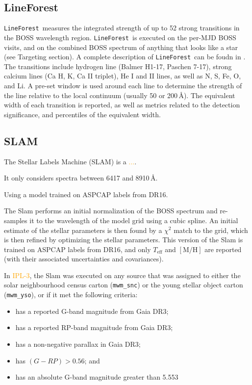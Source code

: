 \documentclass[modern]{aastex631}
\newcommand{\pipeline}[1]{\texttt{#1}}
\newcommand{\LineForest}{\pipeline{LineForest}}
\newcommand{\todo}[1]{\textcolor{orange}{#1}}
\newcommand{\teff}{T_\mathrm{eff}}
\newcommand{\mh}{[\mathrm{M/H}]}
\begin{document}
\subsection{LineForest} \label{sec:methods-line-forest}

\LineForest\ measures the integrated strength of up to 52 strong transitions in the BOSS wavelength region. \LineForest\ is executed on the per-MJD BOSS visits, and on the combined BOSS spectrum of anything that looks like a star (see Targeting section). A complete description of \LineForest\ can be foudn in \citet{somewhere}. The transitions include hydrogen line (Balmer H1-17, Paschen 7-17), strong calcium lines (Ca H, K, Ca II triplet), He I and II lines, as well as N, S, Fe, O, and Li. A pre-set window is used around each line to determine the strength of the line relative to the local continuum (usually 50 or 200\,\AA). The equivalent width of each transition is reported, as well as metrics related to the detection significance, and percentiles of the equivalent width. 


\subsection{SLAM} \label{sec:methods-slam}

The Stellar Labels Machine (SLAM) is a \todo{...}.

It only considers spectra between 6417 and 8910\,\AA. 

Using a model trained on ASPCAP labels from DR16.

The Slam performs an initial normalization of the BOSS spectrum and re-samples it to the wavelength of the model grid using a cubic spline. An initial estimate of the stellar parameters is then found by a $\chi^2$ match to the grid, which is then refined by optimizing the stellar parameters. This version of the Slam is trained on ASPCAP labels from DR16, and only $\teff$ and $\mh$ are reported (with their associated uncertainties and covariances).


In \todo{IPL-3}, the Slam was executed on any source that was assigned to either the solar neighbourhood census carton (\texttt{mwm\_snc}) or the young stellar object carton (\texttt{mwm\_yso}), or if it met the following criteria:
\begin{itemize}
	\item has a reported G-band magnitude from Gaia DR3;
	\item has a reported RP-band magnitude from Gaia DR3;
	\item has a non-negative parallax in Gaia DR3;
	\item has $(G - RP) > 0.56$; and
	\item has an absolute G-band magnitude greater than 5.553
\end{itemize}
\end{document}
